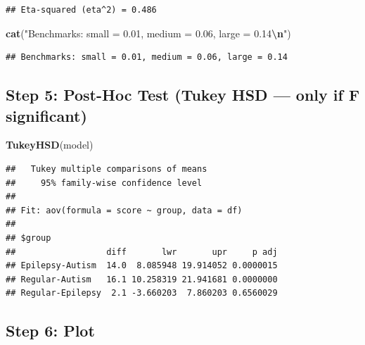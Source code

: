 \documentclass[
]{article}
\newenvironment{Shaded}{\begin{snugshade}}{\end{snugshade}}
\newcommand{\FunctionTok}[1]{\textcolor[rgb]{0.13,0.29,0.53}{\textbf{#1}}}
\newcommand{\NormalTok}[1]{#1}
\newcommand{\SpecialCharTok}[1]{\textcolor[rgb]{0.81,0.36,0.00}{\textbf{#1}}}
\newcommand{\StringTok}[1]{\textcolor[rgb]{0.31,0.60,0.02}{#1}}
\begin{document}
\begin{verbatim}
## Eta-squared (eta^2) = 0.486
\end{verbatim}

\begin{Shaded}
\begin{Highlighting}[]
\FunctionTok{cat}\NormalTok{(}\StringTok{"Benchmarks: small = 0.01, medium = 0.06, large = 0.14}\SpecialCharTok{\textbackslash{}n}\StringTok{"}\NormalTok{)}
\end{Highlighting}
\end{Shaded}

\begin{verbatim}
## Benchmarks: small = 0.01, medium = 0.06, large = 0.14
\end{verbatim}

\subsection{Step 5: Post-Hoc Test (Tukey HSD --- only if F
significant)}\label{step-5-post-hoc-test-tukey-hsd-only-if-f-significant}

\begin{Shaded}
\begin{Highlighting}[]
\FunctionTok{TukeyHSD}\NormalTok{(model)}
\end{Highlighting}
\end{Shaded}

\begin{verbatim}
##   Tukey multiple comparisons of means
##     95% family-wise confidence level
## 
## Fit: aov(formula = score ~ group, data = df)
## 
## $group
##                  diff       lwr       upr     p adj
## Epilepsy-Autism  14.0  8.085948 19.914052 0.0000015
## Regular-Autism   16.1 10.258319 21.941681 0.0000000
## Regular-Epilepsy  2.1 -3.660203  7.860203 0.6560029
\end{verbatim}

\subsection{Step 6: Plot}\label{step-6-plot}
\end{document}
